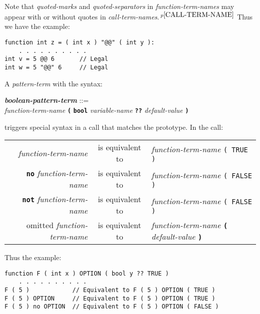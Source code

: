 \documentclass[12pt]{article}
\newcommand{\TT}[1]{{\tt \bfseries #1}}
\newcommand{\emkey}[1]{{\em \bfseries #1}}
\newcommand{\pagnote}[1]{$\,^{p\pageref{#1}}$}
\newenvironment{indpar}[1][0.3in]%
	{\begin{list}{}%
		     {\setlength{\itemsep}{0in}%
		      \setlength{\topsep}{0in}%
		      \setlength{\parsep}{1ex}%
		      \setlength{\labelwidth}{#1}%
		      \setlength{\leftmargin}{#1}%
		      \addtolength{\leftmargin}{\labelsep}}%
	 \item}%
	{\end{list}}
\begin{document}
Note that {\em quoted-marks} and {\em quoted-separators}
in {\em function-term-names} may appear with or without quotes in
{\em call-term-names}.\pagnote{CALL-TERM-NAME}  Thus we have the example:
\begin{indpar}\begin{verbatim}
function int z = ( int x ) "@@" ( int y ):
    . . . . . . . . . .
int v = 5 @@ 6       // Legal
int w = 5 "@@" 6     // Legal
\end{verbatim}\end{indpar}

A {\em pattern-term} with the syntax:
\begin{indpar}
\emkey{boolean-pattern-term}\label{BOOLEAN-PATTERN-TERM} ::= \\
\hspace*{1in} {\em function-term-name} \TT{(}
        \TT{bool} {\em variable-name}
	\TT{??} {\em default-value} \TT{)}
\end{indpar}

triggers special syntax in a call that matches the prototype.
In the call:
\begin{center}
\begin{tabular}{rcl}
{\em function-term-name} & is equivalent to
                         & {\em function-term-name} \tt ( TRUE ) \\
\TT{no} {\em function-term-name} & is equivalent to
                         & {\em function-term-name} \tt ( FALSE ) \\
\TT{not} {\em function-term-name} & is equivalent to
                         & {\em function-term-name} \tt ( FALSE ) \\
omitted {\em function-term-name} & is equivalent to
                         & {\em function-term-name}
			   \TT{(} {\em default-value} \TT{)} \\
\end{tabular}
\end{center}
Thus the example:
\begin{indpar}\begin{verbatim}
function F ( int x ) OPTION ( bool y ?? TRUE )
    . . . . . . . . . .
F ( 5 )            // Equivalent to F ( 5 ) OPTION ( TRUE )
F ( 5 ) OPTION     // Equivalent to F ( 5 ) OPTION ( TRUE )
F ( 5 ) no OPTION  // Equivalent to F ( 5 ) OPTION ( FALSE )
\end{verbatim}\end{indpar}
\end{document}
